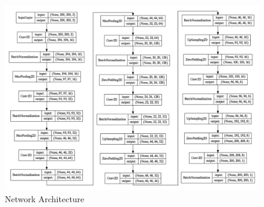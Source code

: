 \begin{figure}
  \includegraphics[width=\linewidth]{images/network.png}
  \caption{Network Architecture}
  \label{fig:network}
\end{figure}